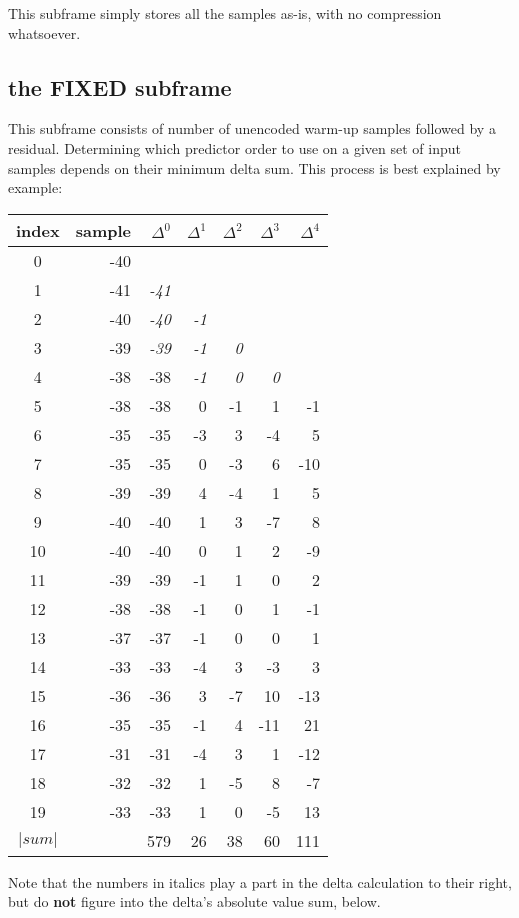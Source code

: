 This subframe simply stores all the samples as-is,
with no compression whatsoever.

\pagebreak



\subsection{the FIXED subframe}

This subframe consists of  number of unencoded
warm-up samples followed by a residual.
Determining which predictor order to use on a given set of input samples
depends on their minimum delta sum.
This process is best explained by example:

\begin{table}[h]
\begin{tabular}{|c|r|r|r|r|r|r|}
\hline
index & sample & $\Delta ^ 0$ & $\Delta ^ 1$ & $\Delta ^ 2$ & $\Delta ^ 3$ & $\Delta ^ 4$ \\
\hline
0 & -40 & & & & & \\
1 & -41 & \textit{-41} & & & & \\
2 & -40 & \textit{-40} & \textit{-1} & & & \\
3 & -39 & \textit{-39} & \textit{-1} & \textit{0} & & \\
4 & -38 & -38 & \textit{-1} & \textit{0} & \textit{0} & \\
5 & -38 & -38 & 0 & -1 & 1 & -1 \\
6 & -35 & -35 & -3 & 3 & -4 & 5 \\
7 & -35 & -35 & 0 & -3 & 6 & -10 \\
8 & -39 & -39 & 4 & -4 & 1 & 5 \\
9 & -40 & -40 & 1 & 3 & -7 & 8 \\
10 & -40 & -40 & 0 & 1 & 2 & -9 \\
11 & -39 & -39 & -1 & 1 & 0 & 2 \\
12 & -38 & -38 & -1 & 0 & 1 & -1 \\
13 & -37 & -37 & -1 & 0 & 0 & 1 \\
14 & -33 & -33 & -4 & 3 & -3 & 3 \\
15 & -36 & -36 & 3 & -7 & 10 & -13 \\
16 & -35 & -35 & -1 & 4 & -11 & 21 \\
17 & -31 & -31 & -4 & 3 & 1 & -12 \\
18 & -32 & -32 & 1 & -5 & 8 & -7 \\
19 & -33 & -33 & 1 & 0 & -5 & 13 \\
\hline
$| sum |$ &  & 579 & 26 & 38 & 60 & 111 \\
\hline
\end{tabular}
\end{table}
\par
\noindent
Note that the numbers in italics play a part in the delta
calculation to their right, but do \textbf{not} figure into the
delta's absolute value sum, below.


